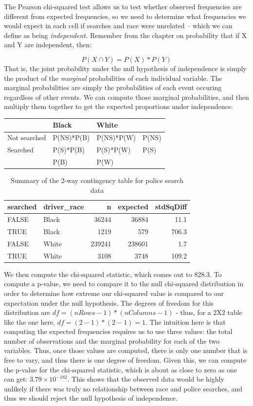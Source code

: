 \documentclass[12pt,]{book}
\theoremstyle{definition}
\theoremstyle{definition}
\theoremstyle{definition}
\theoremstyle{remark}
\begin{document}
The Pearson chi-squared test allows us to test whether observed frequencies are different from expected frequencies, so we need to determine what frequencies we would expect in each cell if searches and race were unrelated -- which we can define as being \emph{independent.} Remember from the chapter on probability that if X and Y are independent, then:

\[
P(X \cap Y) = P(X) * P(Y)
\]
That is, the joint probability under the null hypothesis of independence is simply the product of the \emph{marginal} probabilities of each individual variable. The marginal probabilities are simply the probabilities of each event occuring regardless of other events. We can compute those marginal probabilities, and then multiply them together to get the expected proportions under independence.

\begin{longtable}[]{@{}llll@{}}
\toprule
& Black & White &\tabularnewline
\midrule
\endhead
Not searched & P(NS)*P(B) & P(NS)*P(W) & P(NS)\tabularnewline
Searched & P(S)*P(B) & P(S)*P(W) & P(S)\tabularnewline
& P(B) & P(W) &\tabularnewline
\bottomrule
\end{longtable}

\begin{table}

\caption{\label{tab:unnamed-chunk-83}Summary of the 2-way contingency table for police search data}
\centering
\begin{tabular}[t]{l|l|r|r|r}
\hline
searched & driver\_race & n & expected & stdSqDiff\\
\hline
FALSE & Black & 36244 & 36884 & 11.1\\
\hline
TRUE & Black & 1219 & 579 & 706.3\\
\hline
FALSE & White & 239241 & 238601 & 1.7\\
\hline
TRUE & White & 3108 & 3748 & 109.2\\
\hline
\end{tabular}
\end{table}

We then compute the chi-squared statistic, which comes out to 828.3.
To compute a p-value, we need to compare it to the null chi-squared distribution in order to determine how extreme our chi-squared value is compared to our expectation under the null hypothesis. The degrees of freedom for this distribution are \(df = (nRows - 1) * (nColumns - 1)\) - thus, for a 2X2 table like the one here, \(df = (2-1)*(2-1)=1\). The intuition here is that computing the expected frequencies requires us to use three values: the total number of observations and the marginal probability for each of the two variables. Thus, once those values are computed, there is only one number that is free to vary, and thus there is one degree of freedom. Given this, we can compute the p-value for the chi-squared statistic, which is about as close to zero as one can get: \(3.79 \times 10^{-182}\). This shows that the observed data would be highly unlikely if there was truly no relationship between race and police searches, and thus we should reject the null hypothesis of independence.
\end{document}
